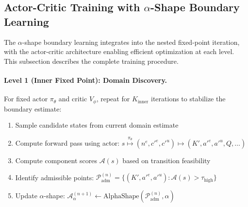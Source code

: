 \subsection{Actor-Critic Training with $\alpha$-Shape Boundary Learning}\label{sec:alpha_shape_training}

The $\alpha$-shape boundary learning integrates into the nested fixed-point iteration, with the actor-critic architecture enabling efficient optimization at each level. This subsection describes the complete training procedure.

\paragraph{Level 1 (Inner Fixed Point): Domain Discovery.}
For fixed actor $\pi_\theta$ and critic $V_\phi$, repeat for $K_{\text{inner}}$ iterations to stabilize the boundary estimate:
\begin{enumerate}
    \item Sample candidate states from current domain estimate
    \item Compute forward pass using actor: $s \stackrel{\pi_\theta}{\mapsto} (n^e, c'^e, c'^u) \mapsto (K', a'^e, a'^u, Q, \ldots)$
    \item Compute component scores $\mathcal{A}(s)$ based on transition feasibility
    \item Identify admissible points: $\mathcal{P}_{\text{adm}}^{(n)} = \{(K', a'^e, a'^u) : \mathcal{A}(s) > \tau_{\text{high}}\}$
    \item Update $\alpha$-shape: $\mathcal{A}_\alpha^{(n+1)} \gets \text{AlphaShape}(\mathcal{P}_{\text{adm}}^{(n)}, \alpha)$
\end{enumerate}

